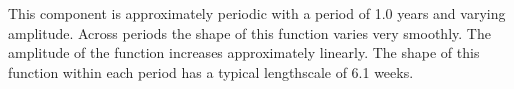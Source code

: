 This component is approximately periodic with a period of 1.0 years and varying amplitude.
Across periods the shape of this function varies very smoothly.
The amplitude of the function increases approximately linearly.
The shape of this function within each period has a typical lengthscale of 6.1 weeks.